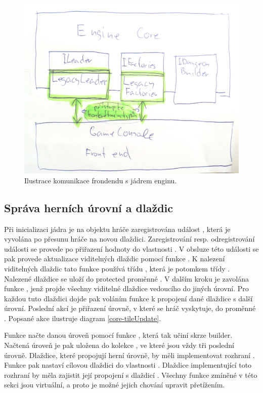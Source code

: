 \begin{figure}[H]\centering
\includegraphics[width=\textwidth]{./img/frontend-core.png}
\caption{Ilustrace komunikace frondendu s jádrem enginu. }
\label{frontend-core}
\end{figure}

\subsection{Správa herních úrovní a dlaždic}\label{engine-level-management}
Při inicializaci jádra je na objektu hráče zaregistrována událost , která
je vyvolána po přesunu hráče na novou dlaždici. Zaregistrování resp. odregistrování události se provede po
přiřazení hodnoty do vlastnosti . V obsluze této události se pak provede aktualizace
viditelných dlaždic pomocí funkce . K nalezení viditelných dlaždic tato funkce používá
třídu , která je potomkem třídy . Nalezené dlaždice se
uloží do protected proměnné . V dalším kroku je zavolána funkce 
, jenž projde všechny viditelné dlaždice vedoucího do jiných úrovní. Pro
každou tuto dlaždici dojde pak voláním funkce  k propojení dané dlaždice s další
úrovní. Poslední akcí je přiřazení úrovně, v které se hráč vyskytuje, do proměnné .
Popsané akce ilustruje diagram \ref{core-tileUpdate}.

Funkce  načte danou úroveň pomocí funkce , která tak učiní skrze builder.
Načtená úroveň je pak uložena do kolekce , ve které jsou vždy tři poslední úrovně.
Dlaždice, které propojují herní úrovně, by měli implementovat rozhraní .
Funkce  pak nastaví cílovou dlaždici do vlastnosti .
Dlaždice implementující toto rozhraní by měla zajistit její propojení s dlaždicí .
Všechny funkce zmíněné v této sekci jsou virtuální, a proto je možné jejich chování upravit přetížením.

